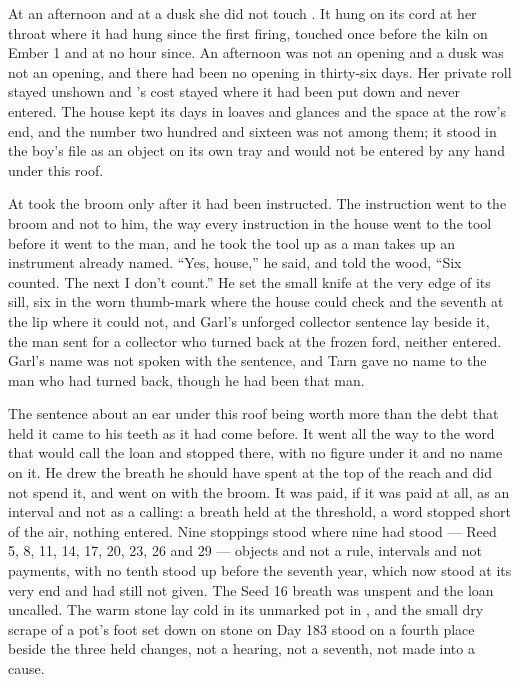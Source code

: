 At an afternoon and at a dusk she did not touch . It hung on its cord at her throat where it had hung since the first firing, touched once before the kiln on Ember 1 and at no hour since. An afternoon was not an opening and a dusk was not an opening, and there had been no opening in thirty-six days. Her private roll stayed unshown and 's cost stayed where it had been put down and never entered. The house kept its days in loaves and glances and the space at the row's end, and the number two hundred and sixteen was not among them; it stood in the boy's file as an object on its own tray and would not be entered by any hand under this roof.

\scenebreak

At   took the broom only after it had been instructed. The instruction went to the broom and not to him, the way every instruction in the house went to the tool before it went to the man, and he took the tool up as a man takes up an instrument already named. “Yes, house,” he said, and told the wood, “Six counted. The next I don't count.” He set the small knife at the very edge of its sill, six in the worn thumb-mark where the house could check and the seventh at the lip where it could not, and Garl's unforged collector sentence lay beside it, the man sent for a collector who turned back at the frozen ford, neither entered. Garl's name was not spoken with the sentence, and Tarn gave no name to the man who had turned back, though he had been that man.

The sentence about an ear under this roof being worth more than the debt that held it came to his teeth as it had come before. It went all the way to the word that would call the loan and stopped there, with no figure under it and no name on it. He drew the breath he should have spent at the top of the reach and did not spend it, and went on with the broom. It was paid, if it was paid at all, as an interval and not as a calling: a breath held at the threshold, a word stopped short of the air, nothing entered. Nine stoppings stood where nine had stood --- Reed 5, 8, 11, 14, 17, 20, 23, 26 and 29 --- objects and not a rule, intervals and not payments, with no tenth stood up before the seventh year, which now stood at its very end and had still not given. The Seed 16 breath was unspent and the loan uncalled. The warm stone lay cold in its unmarked pot in , and the small dry scrape of a pot's foot set down on stone on Day 183 stood on a fourth place beside the three held changes, not a hearing, not a seventh, not made into a cause.

